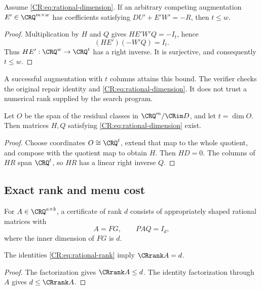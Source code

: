 \begin{CRtheorem}\label{CR:thm:rational-lower}
Assume \eqref{CR:eq:rational-dimension}. If an arbitrary competing augmentation $E'\in\CRQ^{m\times w}$ has coefficients satisfying $DU'+E'W'=-R$, then $t\leq w$.
\end{CRtheorem}
\begin{proof}
Multiplication by $H$ and $Q$ gives $HE'W'Q=-I_t$, hence
\[
 (HE')(-W'Q)=I_t.
\]
Thus $HE':\CRQ^w\to\CRQ^t$ has a right inverse. It is surjective, and consequently $t\leq w$.
\end{proof}

A successful augmentation with $t$ columns attains this bound. The verifier checks the original repair identity and \eqref{CR:eq:rational-dimension}. It does not trust a numerical rank supplied by the search program.

\begin{CRproposition}
Let $O$ be the span of the residual classes in $\CRQ^m/\CRim D$, and let $t=\dim O$. Then matrices $H,Q$ satisfying \eqref{CR:eq:rational-dimension} exist.
\end{CRproposition}
\begin{proof}
Choose coordinates $O\cong\CRQ^t$, extend that map to the whole quotient, and compose with the quotient map to obtain $H$. Then $HD=0$. The columns of $HR$ span $\CRQ^t$, so $HR$ has a linear right inverse $Q$.
\end{proof}

\subsection{Exact rank and menu cost}
For $A\in\CRQ^{a\times b}$, a certificate of rank $d$ consists of appropriately shaped rational matrices with
\begin{equation}\label{CR:eq:rational-rank}
 A=FG,\qquad PAQ=I_d,
\end{equation}
where the inner dimension of $FG$ is $d$.

\begin{CRproposition}
The identities \eqref{CR:eq:rational-rank} imply $\CRrank A=d$.
\end{CRproposition}
\begin{proof}
The factorization gives $\CRrank A\leq d$. The identity factorization through $A$ gives $d\leq\CRrank A$.
\end{proof}

